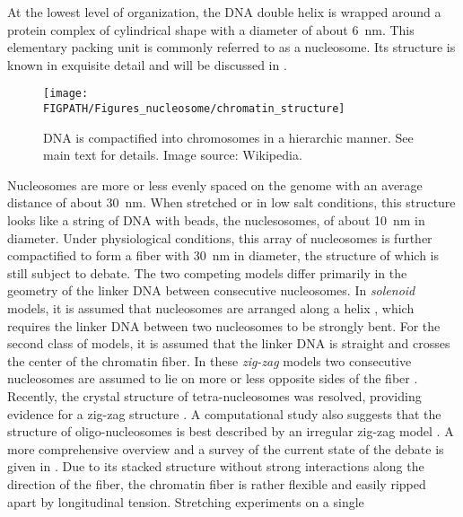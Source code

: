 At the lowest level of organization, the DNA double helix is wrapped
around a protein complex of cylindrical shape with a diameter of about 6~nm. This elementary packing unit is commonly 
referred to as a nucleosome. Its structure is known in exquisite detail and will be discussed in .
\begin{figure}
\centering
\texttt{[image: \\FIGPATH/Figures\_nucleosome/chromatin\_structure]}
\caption[Hierarchical organization of chromatin.]{\label{fig:chromosome_organization}
DNA is compactified into chromosomes in a hierarchic manner. See main text for details. 
Image source: Wikipedia.}
\end{figure}
Nucleosomes are more or less evenly spaced on the genome with an average distance of about 30~nm. 
When stretched or in low salt conditions, this structure looks like a string of DNA with beads, 
the nuclesosomes, of about 10~nm in diameter. 
Under physiological conditions, this array of nucleosomes is further compactified to form a fiber  with 
30~nm in diameter, the structure of which is still subject to debate. The two competing models 
differ primarily in the geometry of the linker DNA between consecutive nucleosomes. In \emph{solenoid}
models, it is assumed that nucleosomes are arranged along a helix \cite{Finch_PNAS_76}, which 
requires the linker DNA between two nucleosomes to be strongly bent. For the second class of models,
it is assumed that the linker DNA is straight and crosses the center of the chromatin fiber. In 
these \emph{zig-zag} models two consecutive nucleosomes are assumed to lie on more or 
less opposite sides of the fiber \cite{Woodcock_PNAS_93}. Recently, the crystal structure
of tetra-nucleosomes was resolved, providing evidence for a zig-zag structure \cite{Dorigo_Science_04, Schalch_Nature_05}. A computational study also suggests
that the structure of oligo-nucleosomes is best described by an irregular zig-zag model \cite{Arya_PNAS_06}.
A more comprehensive overview and a survey of the current state of the debate is given in .
Due to its stacked structure without strong interactions along the direction of the fiber, the chromatin 
fiber is rather flexible and easily ripped apart by longitudinal tension. Stretching experiments on a single
